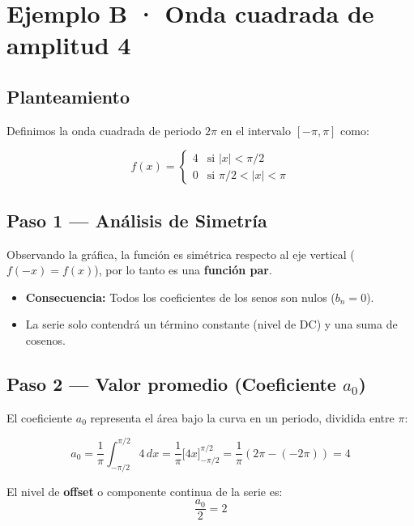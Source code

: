 \documentclass[
  letterpaper,
  DIV=11,
  numbers=noendperiod]{scrreprt}
\providecommand{\tightlist}{%
  \setlength{\itemsep}{0pt}\setlength{\parskip}{0pt}}
\begin{document}
\section{Ejemplo B · Onda cuadrada de amplitud 4}\label{sec-ej-b}

\subsection{Planteamiento}\label{planteamiento-5}

Definimos la onda cuadrada de periodo \(2\pi\) en el intervalo
\([-\pi, \pi]\) como:

\[
f(x) = \begin{cases} 4 & \text{si } |x| < \pi/2 \\ 0 & \text{si } \pi/2 < |x| < \pi \end{cases}
\]

\subsection{Paso 1 --- Análisis de
Simetría}\label{paso-1-anuxe1lisis-de-simetruxeda-1}

Observando la gráfica, la función es simétrica respecto al eje vertical
(\(f(-x) = f(x)\)), por lo tanto es una \textbf{función par}.

\begin{itemize}
\tightlist
\item
  \textbf{Consecuencia:} Todos los coeficientes de los senos son nulos
  (\(b_n = 0\)).
\item
  La serie solo contendrá un término constante (nivel de DC) y una suma
  de cosenos.
\end{itemize}

\subsection{\texorpdfstring{Paso 2 --- Valor promedio (Coeficiente
\(a_0\))}{Paso 2 --- Valor promedio (Coeficiente a\_0)}}\label{paso-2-valor-promedio-coeficiente-a_0}

El coeficiente \(a_0\) representa el área bajo la curva en un periodo,
dividida entre \(\pi\):

\[
a_0 = \frac{1}{\pi}\int_{-\pi/2}^{\pi/2} 4\,dx = \frac{1}{\pi} \Big[ 4x \Big]_{-\pi/2}^{\pi/2} = \frac{1}{\pi} (2\pi - (-2\pi)) = 4
\]

El nivel de \textbf{offset} o componente continua de la serie es:
\[\frac{a_0}{2} = 2\]
\end{document}

